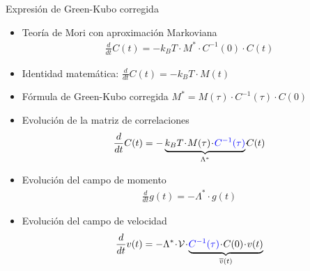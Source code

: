 \documentclass{beamer}
\newcommand{\esc}{\!\cdot\!}
\begin{document}
\begin{frame}{Expresión de Green-Kubo corregida}
  \begin{itemize}
    \item<1-> Teoría de Mori con aproximación Markoviana
      \begin{align}
        \frac{d}{dt}C(t)=-k_BT\esc M^*\esc C^{-1}(0)\esc C(t)
        \nonumber
      \end{align}
    \item<2-> Identidad matemática:  $\frac{d}{dt}C(t)=-k_B T\esc M(t)$
    \item<3-> Fórmula de Green-Kubo corregida  
       $ M^*=M(\tau)\esc C^{-1}(\tau)\esc C(0)$
    \item<4-> Evolución de la matriz de correlaciones
      \begin{align}
        \frac{d}{dt}C(t)=-\underbrace{k_BT\esc M(\tau)\esc {\color{blue} C^{-1}(\tau)}}_{\Lambda^*}\esc C(t)
        \nonumber
      \end{align}
    \item<5-> Evolución del campo de momento
      \begin{align}
        \frac{d}{dt}g(t)=-\Lambda^*\esc g(t)
        \nonumber
      \end{align}
    \item<6-> Evolución del campo de velocidad
      \begin{align}
        \frac{d}{dt}v(t)=-\Lambda^*\esc {\cal V}\esc \underbrace{{\color{blue}C^{-1}(\tau)}\esc C(0)\esc v(t)}_{\overline{v}(t)}
        \nonumber
      \end{align}
  \end{itemize}
\end{frame}
\end{document}
